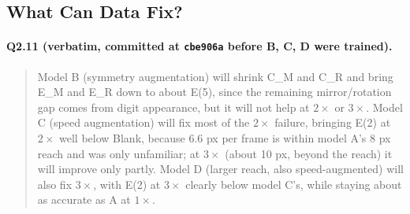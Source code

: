 \documentclass[11pt,a4paper]{article}
\begin{document}
\subsection{What Can Data Fix?}

\paragraph{Q2.11 (verbatim, committed at \texttt{cbe906a} before B, C, D were trained).}
\begin{quote}\small
Model B (symmetry augmentation) will shrink C\_M and C\_R and bring E\_M and E\_R down to about E(5), since the remaining mirror/rotation gap comes from digit appearance, but it will not help at $2\times$ or $3\times$. Model C (speed augmentation) will fix most of the $2\times$ failure, bringing E(2) at $2\times$ well below Blank, because 6.6 px per frame is within model A's 8 px reach and was only unfamiliar; at $3\times$ (about 10 px, beyond the reach) it will improve only partly. Model D (larger reach, also speed-augmented) will also fix $3\times$, with E(2) at $3\times$ clearly below model C's, while staying about as accurate as A at $1\times$.
\end{quote}
\end{document}

